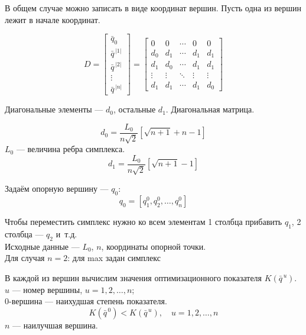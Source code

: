 \documentclass[12pt,a5paper]{scrbook}
\begin{document}
  В общем случае можно записать в виде координат вершин. Пусть одна из вершин лежит в начале координат.

  $$
  D=
  \begin{bmatrix}
    \bar{q}_0 \\
    \bar{q}^{\,|1|} \\
    \bar{q}^{\,|2|} \\
    \vdots \\
    \bar{q}^{\,|n|}
  \end{bmatrix}    
  =
  \begin{bmatrix}
    0   & 0   & \cdots & 0 & 0     \\
    d_0 & d_1 & \cdots & d_1 & d_1 \\
    d_1 & d_0 & \cdots & d_1 & d_1 \\
    \vdots & \vdots & \ddots & \vdots & \vdots \\
    d_1 & d_1 & \cdots & d_1 & d_0
  \end{bmatrix}
  $$  
  
  Диагональные элементы --- $d_0$, остальные $d_1$. Диагональная матрица.
  
  $$
  d_0 = \frac{L_0}{n\sqrt{2}} \left[\sqrt{n+1}+n-1\right]
  $$
  $L_0$ --- величина ребра симплекса.
  $$
  d_1 = \frac{L_0}{n\sqrt{2}} \left[\sqrt{n+1}-1\right]
  $$
  
  Задаём опорную вершину --- $q_0$:
  $$
  q_0 = \left[q_1^0, q_2^0, \dotsc, q_n^0\right]
  $$
  
  Чтобы переместить симплекс нужно ко всем элементам 1 столбца прибавить $q_1$, 2 столбца --- $q_2$ и~т.д.\\
  
  Исходные данные --- $L_0$, $n$, координаты опорной точки.\\
  
  Для случая $n=2$: для max задан симплекс
  
  
  В каждой из вершин вычислим значения оптимизационного показателя $K(\bar{q}^{\,u})$.\\
  $u$ --- номер вершины, $u=1,2,\dotsc,n$;\\
  0-вершина --- наихудшая степень показателя.
  $$K(\bar{q}^{\,0}) < K(\bar{q}^{\,u}),\quad u=1,2,\dotsc,n$$
  $n$ --- наилучшая вершина.\\
  
\end{document}
